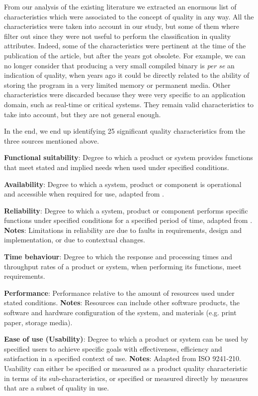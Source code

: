 From our analysis of the existing literature we extracted an enormous list of characteristics which were associated to the concept of quality in any way. All the characteristics were taken into account in our study, but some of them where filter out since they were not useful to perform the classification in quality attributes. Indeed, some of the characteristics were pertinent at the time of the publication of the article, but after the years got obsolete. For example, we can no longer consider that producing a very small compiled binary is \textit{per se} an indication of quality, when years ago it could be directly related to the ability of storing the program in a very limited memory or permanent media. Other characteristics were discarded because they were very specific to an application domain, such as real-time or critical systems. They remain valid characteristics to take into account, but they are not general enough.

In the end, we end up identifying 25 significant quality characteristics from the three sources mentioned above.

\textbf{Functional suitability}: Degree to which a product or system provides functions that meet stated and implied needs when used under specified conditions.

\textbf{Availability}: Degree to which a system, product or component is operational and accessible when required for use, adapted from \cite{iso_central_secretary_isoiecieee_2010}.

\textbf{Reliability}: Degree to which a system, product or component performs specific functions under specified conditions for a specified period of time, adapted from \cite{iso_central_secretary_isoiecieee_2010}. \textbf{Notes}: Limitations in reliability are due to faults in requirements, design and implementation, or due to contextual changes.

\textbf{Time behaviour}: Degree to which the response and processing times and throughput rates of a product or system, when performing its functions, meet requirements.

\textbf{Performance}: Performance relative to the amount of resources used under stated conditions. \textbf{Notes}: Resources can include other software products, the software and hardware configuration of the system, and materials (e.g. print paper, storage media).

\textbf{Ease of use (Usability)}: Degree to which a product or system can be used by specified users to achieve specific goals with effectiveness, efficiency and satisfaction in a specified context of use. \textbf{Notes}: Adapted from ISO 9241-210. Usability can either be specified or measured as a product quality characteristic in terms of its sub-characteristics, or specified or measured directly by measures that are a subset of quality in use.

